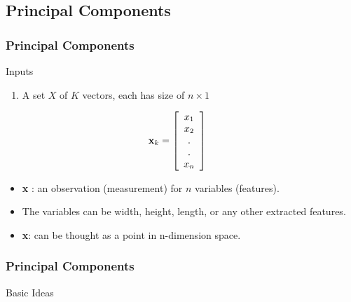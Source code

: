 \documentclass[english,11pt,table,handout]{beamer}
\begin{document}
\subsection{Principal Components}
\frame
{
	\frametitle{Principal Components}
	\large
	\begin{block}{Inputs}
		\begin{enumerate}
			\item A set $X$ of $K$ vectors, each has size of $n \times 1$
		\end{enumerate}
		\begin{equation}
			\nonumber
			\begin{split}
				\text{\textbf{x}}_k &= \left[
					\begin{array}{c}
						x_1 \\
						x_2 \\
						.\\
						.\\
						x_n
					\end{array}
				\right]
			\end{split}
		\end{equation}
		\begin{itemize}
			\item \textbf{x} : an \alert{observation} (measurement) for $n$ \alert{variables} (features).
			\item The variables can be width, height, length, or any other extracted features.
			\item \textbf{x}: can be thought as \alert{a point in n-dimension space}.
		\end{itemize}
	\end{block}
}
\frame
{
	\frametitle{Principal Components}
	\large
	\begin{block}{Basic Ideas}
	\end{block}
}
\end{document}
